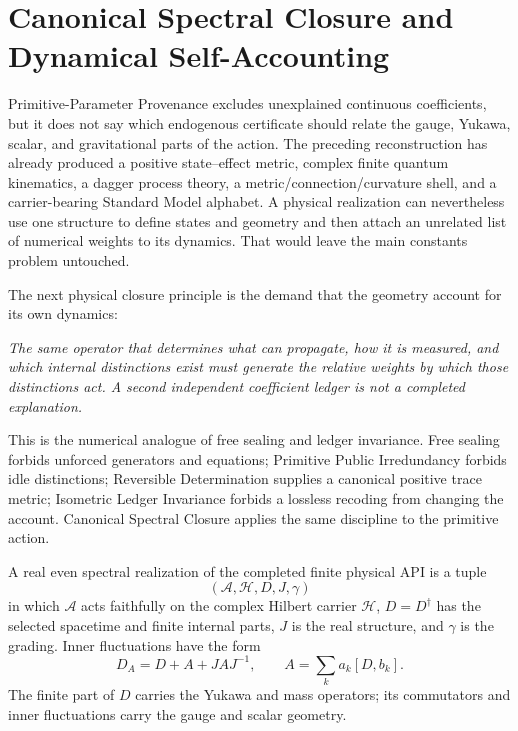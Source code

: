 
\section{Canonical Spectral Closure and Dynamical Self-Accounting}
\label{sec:canonical-spectral-closure}

Primitive-Parameter Provenance excludes unexplained continuous coefficients, but it does
not say which endogenous certificate should relate the gauge, Yukawa, scalar, and
gravitational parts of the action.  The preceding reconstruction has already produced a
positive state--effect metric, complex finite quantum kinematics, a dagger process theory,
a metric/connection/curvature shell, and a carrier-bearing Standard Model alphabet.  A
physical realization can nevertheless use one structure to define states and geometry and
then attach an unrelated list of numerical weights to its dynamics.  That would leave the
main constants problem untouched.

The next physical closure principle is the demand that the geometry account for its own
dynamics:
\begin{center}
\emph{The same operator that determines what can propagate, how it is measured, and which
internal distinctions exist must generate the relative weights by which those distinctions
act.  A second independent coefficient ledger is not a completed explanation.}
\end{center}

This is the numerical analogue of free sealing and ledger invariance.  Free sealing forbids
unforced generators and equations; Primitive Public Irredundancy forbids idle distinctions;
Reversible Determination supplies a canonical positive trace metric; Isometric Ledger
Invariance forbids a lossless recoding from changing the account.  Canonical Spectral
Closure applies the same discipline to the primitive action.

\begin{definition}
A real even spectral realization of the completed finite physical API is a tuple
\[
 (\mathcal A,\mathcal H,D,J,\gamma)
\]
in which $\mathcal A$ acts faithfully on the complex Hilbert carrier $\mathcal H$,
$D=D^\dagger$ has the selected spacetime and finite internal parts, $J$ is the real
structure, and $\gamma$ is the grading.  Inner fluctuations have the form
\[
 D_A=D+A+JAJ^{-1},
 \qquad
 A=\sum_k a_k[D,b_k].
\]
The finite part of $D$ carries the Yukawa and mass operators; its commutators and inner
fluctuations carry the gauge and scalar geometry.
\end{definition}

